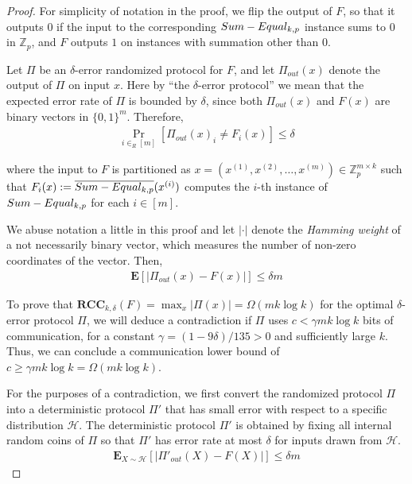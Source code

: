 \documentclass[11pt]{article}
\numberwithin{equation}{section}
\theoremstyle{definition}
\theoremstyle{plain}
\newcommand{\Z}{\mathbb Z}
\newcommand{\follows}{\ensuremath{\sim}}
\newcommand{\zo}{\ensuremath{ \{ 0, 1 \} }}
\newcommand{\error}{\ensuremath{\delta}}
\newcommand{\bigomega}[1]{\ensuremath{{\Omega \left( {#1} \right)}}}
\newcommand{\eqdef}{\ensuremath{:=}}
\newcommand{\E}{\ensuremath{\mathbf{E}}}
\newcommand{\rcc}{\ensuremath{\mathbf{RCC}}}
\newcommand{\sumequal}{\textsc{Sum-Equal} }
\begin{document}
%
%

	\begin{proof}%
		For simplicity of notation in the proof, we flip the output of $F$, so that it outputs $0$ if the input to the corresponding $\sumequal_{k,p}$ instance sums to $0$ in $\Z_p$, and $F$ outputs $1$ on instances with summation other than $0$.

		Let $\Pi$ be an $\error$-error randomized protocol for $F$, and let $\Pi_{out}\left(x\right)$ denote the output of $\Pi$ on input $x$.
		Here by ``the $\error$-error protocol'' we mean that the expected error rate of $\Pi$ is bounded by $\error$, since both $\Pi_{out}(x)$ and $F(x)$ are binary vectors in $\zo^m$.
		Therefore, 
		\begin{align*}
			\Pr_{i\in_R [m]}\left[\Pi_{out}\left(x\right)_i \ne F_i(x) \right]\le \error
		\end{align*}
		
		
		where the input to $F$ is partitioned as $x=\left(x^{(1)},x^{(2)},\dots,x^{(m)}\right)\in \Z_p^{m\times k}$ such that $F_i(x)\eqdef \overline{\sumequal_{k,p}}(x^{(i)})$ computes the $i$-th instance of $\sumequal_{k,p}$ for each $i\in [m]$.

		We abuse notation a little in this proof and let $|\cdot|$ denote the \emph{Hamming weight} of a not necessarily binary vector, 
		which measures the number of non-zero coordinates of the vector. Then, 
		\begin{align*}
		\E\left[ \left|\Pi_{out}\left(x\right) - F(x)\right| \right]\le \error m 
		\end{align*}

		To prove that $\rcc_{k,\error}(F) = \max_{x}|\Pi(x)|=\bigomega{m k\log k}$ for the optimal $\error$-error protocol $\Pi$,
		we will deduce a contradiction if $\Pi$ uses $c<\gamma m k\log k$ bits of communication,
		for a constant $\gamma=(1-9\error)/135>0$ and sufficiently large $k$.
		Thus, we can conclude a communication lower bound of $c\ge \gamma mk\log k= \bigomega{m k \log k}$.

		For the purposes of a contradiction, we first convert the randomized protocol $\Pi$ into a deterministic protocol $\Pi'$ that has small error with respect to a specific distribution $\mathcal{H}$. 
		The deterministic protocol $\Pi'$ is obtained by fixing all internal random coins of $\Pi$ so that $\Pi'$ has error rate at most $\error$ for inputs drawn from $\mathcal{H}$.
		\begin{align*}
			\E_{X\follows \mathcal{H}}\left[ \left| \Pi'_{out}(X) - F(X)\right| \right]\le \error m
		\end{align*}


\end{proof}
\end{document}
